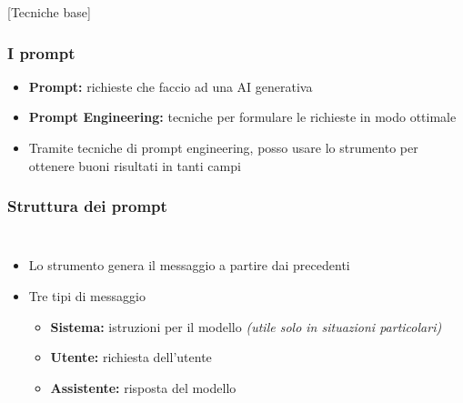 [Tecniche base]


\begin{contentframe}
    \frametitle{I prompt}

    \begin{itemize}
        \item \textbf{Prompt:} richieste che faccio ad una AI generativa
        \item \textbf{Prompt Engineering:} tecniche per formulare le richieste in modo ottimale

        \bigskip
        \item Tramite tecniche di prompt engineering, posso usare lo strumento per ottenere buoni risultati in tanti campi 
    \end{itemize}
\end{contentframe}

\begin{contentframe}
    \frametitle{Struttura dei prompt}

    \begin{columns}
        \begin{itemize}
            \item Lo strumento genera il messaggio a partire dai precedenti
    
            \bigskip
            \item Tre tipi di messaggio
            \begin{itemize}
                \item \textbf{Sistema:} istruzioni per il modello \textit{(utile solo in situazioni particolari)}
                \item \textbf{Utente:} richiesta dell'utente
                \item \textbf{Assistente:} risposta del modello
            \end{itemize}
        \end{itemize}

        \centering
    \end{columns}
\end{contentframe}

